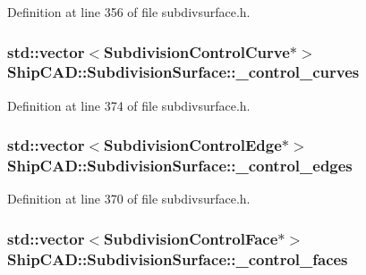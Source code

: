 Definition at line 356 of file subdivsurface.\-h.

\hypertarget{classShipCAD_1_1SubdivisionSurface_a72da0f8a60e186e10b88f48950a490e9}{
\subsubsection[{\-\_\-control\-\_\-curves}]{\setlength{\rightskip}{0pt plus 5cm}std\-::vector$<${\bf Subdivision\-Control\-Curve}$\ast$$>$ Ship\-C\-A\-D\-::\-Subdivision\-Surface\-::\-\_\-control\-\_\-curves\hspace{0.3cm}{\ttfamily [protected]}}}\label{classShipCAD_1_1SubdivisionSurface_a72da0f8a60e186e10b88f48950a490e9}


Definition at line 374 of file subdivsurface.\-h.

\hypertarget{classShipCAD_1_1SubdivisionSurface_ac6b2950f05e07f5a7814b278a9dc1513}{
\subsubsection[{\-\_\-control\-\_\-edges}]{\setlength{\rightskip}{0pt plus 5cm}std\-::vector$<${\bf Subdivision\-Control\-Edge}$\ast$$>$ Ship\-C\-A\-D\-::\-Subdivision\-Surface\-::\-\_\-control\-\_\-edges\hspace{0.3cm}{\ttfamily [protected]}}}\label{classShipCAD_1_1SubdivisionSurface_ac6b2950f05e07f5a7814b278a9dc1513}


Definition at line 370 of file subdivsurface.\-h.

\hypertarget{classShipCAD_1_1SubdivisionSurface_a69c240904f61f8181a57559d4fa548c0}{
\subsubsection[{\-\_\-control\-\_\-faces}]{\setlength{\rightskip}{0pt plus 5cm}std\-::vector$<${\bf Subdivision\-Control\-Face}$\ast$$>$ Ship\-C\-A\-D\-::\-Subdivision\-Surface\-::\-\_\-control\-\_\-faces\hspace{0.3cm}{\ttfamily [protected]}}}\label{classShipCAD_1_1SubdivisionSurface_a69c240904f61f8181a57559d4fa548c0}



